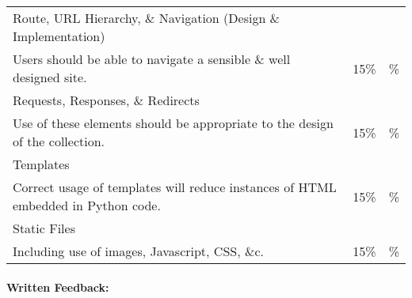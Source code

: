 \documentclass[letterpaper,11pt]{texMemo}
\begin{document}
\begin{tabular}{ l r | l |}
\noalign{\bigskip}
\multicolumn{2}{l}{\textbf{Features (60\%)}}    \\
\hline
Route, URL Hierarchy, \& Navigation (Design \& Implementation)\\ 
\footnotesize{Users should be able to navigate a sensible \& well designed site.}
                                                                                &   15\% &  \%\\%
Requests, Responses, \& Redirects\\ 
\footnotesize{Use of these elements should be appropriate to the design of the collection.}
                                                                                &   15\% &  \%\\%
Templates\\ 
\footnotesize{Correct usage of templates will reduce instances of HTML embedded in Python code.}
                                                                                &   15\% &  \%\\%
Static Files\\ 
\footnotesize{Including use of images, Javascript, CSS, \&c.}
                                                                                &   15\% &  \%\\%
\end{tabular}

\paragraph{Written Feedback:}
\end{document}
